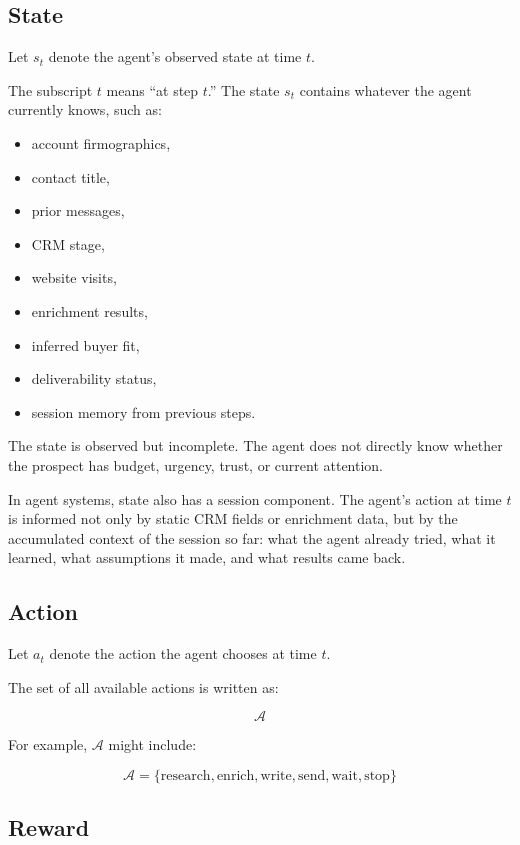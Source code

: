 \documentclass[12pt]{article}
\begin{document}
\subsection{State}

Let \(s_t\) denote the agent's observed state at time \(t\).

The subscript \(t\) means ``at step \(t\).'' The state \(s_t\) contains whatever
the agent currently knows, such as:

\begin{itemize}
    \item account firmographics,
    \item contact title,
    \item prior messages,
    \item CRM stage,
    \item website visits,
    \item enrichment results,
    \item inferred buyer fit,
    \item deliverability status,
    \item session memory from previous steps.
\end{itemize}

The state is observed but incomplete. The agent does not directly know whether
the prospect has budget, urgency, trust, or current attention.

In agent systems, state also has a session component. The agent's action at time
\(t\) is informed not only by static CRM fields or enrichment data, but by the
accumulated context of the session so far: what the agent already tried, what it
learned, what assumptions it made, and what results came back.

\subsection{Action}

Let \(a_t\) denote the action the agent chooses at time \(t\).

The set of all available actions is written as:

\[
\mathcal{A}
\]

For example, \(\mathcal{A}\) might include:

\[
\mathcal{A}
=
\{
\text{research},
\text{enrich},
\text{write},
\text{send},
\text{wait},
\text{stop}
\}
\]

\subsection{Reward}
\end{document}
